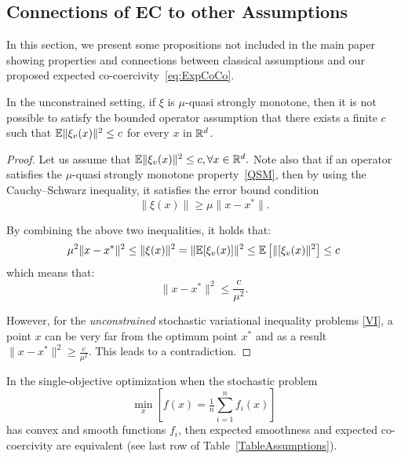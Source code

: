 \documentclass{article}
\begin{document}
\subsection{Connections of EC to other Assumptions}
\label{Appendix_Connections}
In this section, we present some propositions not included in the main paper showing properties and connections between classical assumptions and our proposed expected co-coercivity~\ref{eq:ExpCoCo}.
\begin{proposition}
In the unconstrained setting, if $\xi$ is $\mu$-quasi strongly monotone, then it is not possible to satisfy the bounded operator assumption that there exists a finite $c$ such that $\mathbb{E}\|\xi_v(x)\|^2 \leq c$ for every $x$ in $\mathbb{R}^d$.
\end{proposition}
\begin{proof}
Let us assume that $\mathbb{E}\|\xi_v(x)\|^2 \leq c, \forall x \in \mathbb{R}^d.$
Note also that if an operator satisfies the $\mu$-quasi strongly monotone property~\eqref{QSM}, then by using the Cauchy–Schwarz inequality, it satisfies the error bound condition $$ \|\xi(x)\| \geq \mu \|x-x^*\|.$$

By combining the above two inequalities, it holds that:
$$ \mu^2 \|x-x^*\|^2 \leq \|\xi(x)\|^2=\|\mathbb{E}[\xi_v(x)]\|^2\leq \mathbb{E} \left[\|[\xi_v(x)\|^2\right]\leq c $$
which means that: $$ \|x-x^*\|^2\leq  \frac{c}{\mu^2}.$$

However, for the \emph{unconstrained} stochastic variational inequality problems \eqref{VI}, a point $x$ can be very far from the optimum point $x^*$  and as a result  $\|x-x^*\|^2 \geq  \frac{c }{\mu^2}$. This leads to a contradiction.
\end{proof}

\begin{proposition}
In the single-objective optimization when the stochastic problem $$\min_x \left[f(x) = \tfrac{1}{n} \sum_{i=1}^n f_i(x)\right]$$ has convex and smooth functions $f_i$, then expected smoothness and expected co-coercivity are equivalent (see last row of Table~\ref{TableAssumptions}).
\end{proposition}
\end{document}
